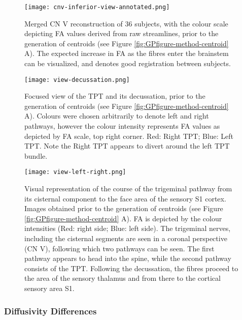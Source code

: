 \begin{figure}[ht]
\centering
\texttt{[image: cnv-inferior-view-annotated.png]}
\caption{Merged CN V reconstruction of 36 subjects, with the colour scale depicting FA values derived from raw streamlines, prior to the generation of centroids (see Figure \ref{fig:GPfigure-method-centroid} A). The expected increase in FA as the fibres enter the brainstem can be visualized, and denotes good registration between subjects. }
\label{fig:GPfigure1}
\end{figure}

\begin{figure}[ht]
\centering
\texttt{[image: view-decussation.png]}
\caption[Focused view of the TPT and its decussation, prior to the generation of centroids.]{Focused view of the TPT and its decussation, prior to the generation of centroids (see Figure \ref{fig:GPfigure-method-centroid} A). Colours were chosen arbitrarily to denote left and right pathways, however the colour intensity represents FA values as depicted by FA scale, top right corner. Red: Right TPT; Blue: Left TPT. Note the Right TPT appears to divert around the left TPT bundle. }
\label{fig:GPfigure2}
\end{figure}

\begin{figure}[ht]
\centering
\texttt{[image: view-left-right.png]}
\caption[Visual representation of the course of the trigeminal pathway from its cisternal component to the face area of the sensory S1 cortex.]{Visual representation of the course of the trigeminal pathway from its cisternal component to the face area of the sensory S1 cortex. Images obtained prior to the generation of centroids (see Figure \ref{fig:GPfigure-method-centroid} A). FA is depicted by the colour intensities (Red: right side; Blue: left side). The trigeminal nerves, including the cisternal segments are seen in a coronal perspective (CN V), following which two pathways can be seen. The first pathway appears to head into the spine, while the second pathway consists of the TPT. Following the decussation, the fibres proceed to the area of the sensory thalamus and from there to the cortical sensory area S1.}
\label{fig:GPfigure3}
\end{figure}

\subsubsection{Diffusivity Differences}
